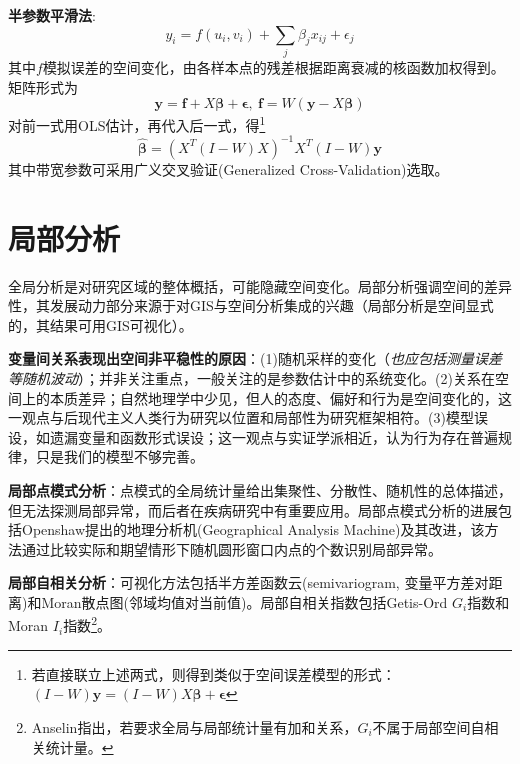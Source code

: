 \par \textbf{半参数平滑法}:
\begin{equation}
    y_i=f(u_i,v_i)+\sum_j \beta_jx_{ij}+\epsilon_j
\end{equation}
其中$f$模拟误差的空间变化，由各样本点的残差根据距离衰减的核函数加权得到。矩阵形式为
\begin{equation}
\mathbf{y}=\mathbf{f}+X\boldsymbol{\beta}+\boldsymbol{\epsilon}, \ \mathbf{f}=W(\mathbf{y}-X\boldsymbol{\beta})
\end{equation}
对前一式用OLS估计，再代入后一式，得\footnote{若直接联立上述两式，则得到类似于空间误差模型的形式：$(I-W)\mathbf{y}=(I- W)X\boldsymbol{\beta}+\boldsymbol{\epsilon}$}
\begin{equation}
    \hat{\boldsymbol{\beta}}=(X^T(I-W)X)^{-1}X^T(I-W)\mathbf{y}
\end{equation}
其中带宽参数可采用广义交叉验证(Generalized Cross-Validation)选取。


\section{局部分析}

\par 全局分析是对研究区域的整体概括，可能隐藏空间变化。局部分析强调空间的差异性，其发展动力部分来源于对GIS与空间分析集成的兴趣（局部分析是空间显式的，其结果可用GIS可视化）。

\par \textbf{变量间关系表现出空间非平稳性的原因}：(1)随机采样的变化（\emph{也应包括测量误差等随机波动}）；并非关注重点，一般关注的是参数估计中的系统变化。(2)关系在空间上的本质差异；自然地理学中少见，但人的态度、偏好和行为是空间变化的，这一观点与后现代主义人类行为研究以位置和局部性为研究框架相符。(3)模型误设，如遗漏变量和函数形式误设；这一观点与实证学派相近，认为行为存在普遍规律，只是我们的模型不够完善。

\par \textbf{局部点模式分析}：点模式的全局统计量给出集聚性、分散性、随机性的总体描述，但无法探测局部异常，而后者在疾病研究中有重要应用。局部点模式分析的进展包括Openshaw提出的地理分析机(Geographical Analysis Machine)及其改进，该方法通过比较实际和期望情形下随机圆形窗口内点的个数识别局部异常。

\par \textbf{局部自相关分析}：可视化方法包括半方差函数云(semivariogram, 变量平方差对距离)和Moran散点图(邻域均值对当前值)。局部自相关指数包括Getis-Ord $G_i$指数和Moran $I_i$指数\footnote{Anselin指出，若要求全局与局部统计量有加和关系，$G_i$不属于局部空间自相关统计量。}。

